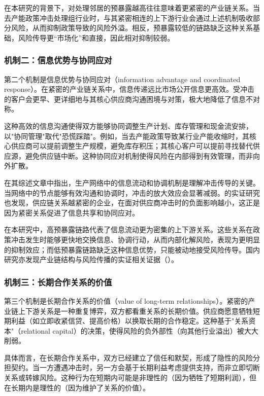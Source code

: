 在本研究的背景下，对处理邻居的预暴露越高往往意味着更紧密的产业链关系。当去产能政策冲击处理组行业时，与其紧密相连的上下游行业会通过上述机制吸收部分风险，从而抑制政策导致的风险外溢。相反，预暴露较低的链路缺乏这种关系基础，风险传导更“市场化”和直接，因此相对抑制较弱。

\subsubsection*{机制二：信息优势与协同应对}

第二个机制是信息优势与协同应对（information advantage and coordinated response）。在紧密的产业链关系中，信息传递远比市场公开信息更高效。受冲击的客户会更早、更详细地与其核心供应商沟通困境与对策，极大地降低了信息不对称。

这种高效的信息沟通使得双方能够协同调整生产计划、库存管理和现金流安排，以"协同管理"取代"恐慌踩踏"。例如，当去产能政策导致某行业产能收缩时，其核心供应商可以提前调整生产规模，避免库存积压；其核心客户可以提前寻找替代供应源，避免供应链中断。这种协同应对机制使得风险在内部得到有效管理，而非向外扩散。

\citet{carvalho2014micro}在其综述文章中指出，生产网络中的信息流动和协调机制是理解冲击传导的关键。当网络中的节点能够有效沟通和协调时，冲击的放大效应会显著减弱。\citet{barrot2016input}的实证研究也发现，供应链关系越紧密的企业，在面对供应商冲击时的负面影响越小，这正是因为紧密关系促进了信息共享和协同应对。

在本研究中，高预暴露链路代表了信息流动更为密集的上下游关系。这些关系在政策冲击发生时能够更快地交换信息、协调行动，从而内部化解风险，表现为更明显的抑制效应；而低预暴露链路缺乏这种信息优势，只能被动地接受风险传导。国内研究亦发现产业链结构与风险传播的实证相关证据（\citep{Yang2023TailRiskIO,Zhao2023DigitalInputNetwork}）。

\subsubsection*{机制三：长期合作关系的价值}

第三个机制是长期合作关系的价值（value of long-term relationships）。紧密的产业链上下游关系是一种重复博弈，双方都看重关系的长期价值。供应商愿意牺牲短期利益（如立即收紧信贷、提高价格）以换取长期的合作稳定。这种基于"关系资本"（relational capital）的决策，使得风险的负外部性（向其他行业溢出）被大大削弱。

具体而言，在长期合作关系中，双方已经建立了信任和默契，形成了隐性的风险分担契约。当一方遭遇冲击时，另一方会基于长期利益考虑提供支持，而非立即切断关系或转嫁风险。这种行为在短期内可能是非理性的（因为牺牲了短期利润），但在长期内是理性的（因为维护了关系的价值）。

